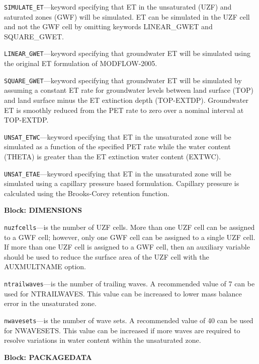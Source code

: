 \begin{description}
\item \texttt{SIMULATE\_ET}---keyword specifying that ET in the unsaturated (UZF) and saturated zones (GWF) will be simulated. ET can be simulated in the UZF cell and not the GWF cell by omitting keywords LINEAR\_GWET and SQUARE\_GWET.

\item \texttt{LINEAR\_GWET}---keyword specifying that groundwater ET will be simulated using the original ET formulation of MODFLOW-2005.

\item \texttt{SQUARE\_GWET}---keyword specifying that groundwater ET will be simulated by assuming a constant ET rate for groundwater levels between land surface (TOP) and land surface minus the ET extinction depth (TOP-EXTDP). Groundwater ET is smoothly reduced from the PET rate to zero over a nominal interval at TOP-EXTDP.

\item \texttt{UNSAT\_ETWC}---keyword specifying that ET in the unsaturated zone will be simulated as a function of the specified PET rate while the water content (THETA) is greater than the ET extinction water content (EXTWC).

\item \texttt{UNSAT\_ETAE}---keyword specifying that ET in the unsaturated zone will be simulated using a capillary pressure based formulation. Capillary pressure is calculated using the Brooks-Corey retention function.

\end{description}
\item \textbf{Block: DIMENSIONS}

\begin{description}
\item \texttt{nuzfcells}---is the number of UZF cells.  More than one UZF cell can be assigned to a GWF cell; however, only one GWF cell can be assigned to a single UZF cell. If more than one UZF cell is assigned to a GWF cell, then an auxiliary variable should be used to reduce the surface area of the UZF cell with the AUXMULTNAME option.

\item \texttt{ntrailwaves}---is the number of trailing waves.  A recommended value of 7 can be used for NTRAILWAVES.  This value can be increased to lower mass balance error in the unsaturated zone.

\item \texttt{nwavesets}---is the number of wave sets.  A recommended value of 40 can be used for NWAVESETS.  This value can be increased if more waves are required to resolve variations in water content within the unsaturated zone.

\end{description}
\item \textbf{Block: PACKAGEDATA}

